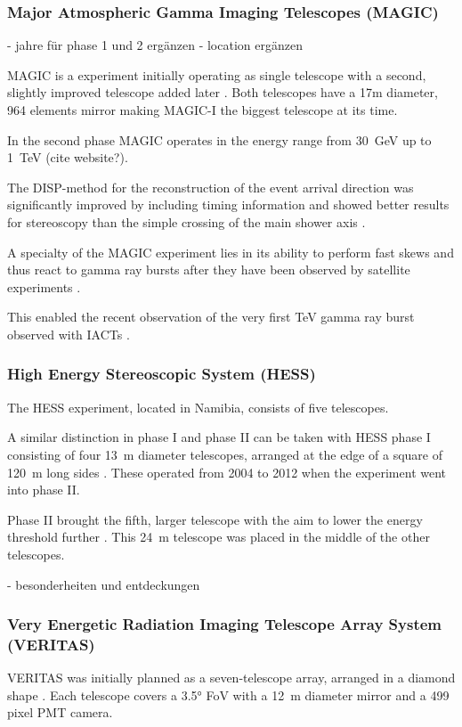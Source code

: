 \subsubsection{Major Atmospheric Gamma Imaging Telescopes (MAGIC)}
- jahre für phase 1 und 2 ergänzen
- location ergänzen

MAGIC is a experiment initially operating as single telescope with a second, slightly improved 
telescope added later \cite{BAIXERAS2003247}.
Both telescopes have a 17m diameter, 964 elements mirror making MAGIC-I the biggest 
telescope at its time.

In the second phase MAGIC operates in the energy range from \SI{30}{\giga\eV}
up to \SI{1}{\TeV} (cite website?).

The DISP-method for the reconstruction of the event arrival direction 
was significantly improved by including timing information and showed better 
results for stereoscopy than the simple crossing of the main shower axis \cite{ALEKSIC2012345}.

A specialty of the MAGIC experiment lies in its ability to 
perform fast skews and thus react to gamma ray bursts after they have been observed 
by satellite experiments \cite{2003ICRC....5.2943B}.

This enabled the recent observation of the very first \si{\TeV}
gamma ray burst observed with IACTs \cite{collaboration2019teraelectronvolt}.


\subsubsection{High Energy Stereoscopic System (HESS)}

The HESS experiment, located in Namibia,  consists of five telescopes.

A similar distinction in phase I and phase II can be taken with 
HESS phase I consisting of four \SI{13}{\meter} diameter telescopes,
arranged at the edge of a square of \SI{120}{\meter} long sides \cite{HINTON2004331}.
These operated from 2004 to 2012 when the experiment went into phase II.

Phase II brought the fifth, larger telescope with the aim to lower the energy threshold
further \cite{vincent2005hess}. This \SI{24}{\meter} telescope was placed in the middle of the other
telescopes.

- besonderheiten und entdeckungen

\subsubsection{Very Energetic Radiation Imaging Telescope Array System (VERITAS)}
VERITAS	was initially planned as a seven-telescope array, arranged in a diamond shape
\cite{WEEKES2002221}.
Each telescope covers a 3.5° FoV with a \SI{12}{\meter} diameter mirror and 
a 499 pixel PMT camera.


